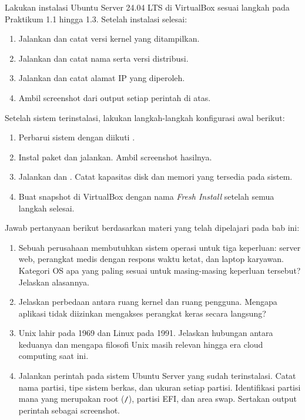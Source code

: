 \begin{exercisebox}
Lakukan instalasi Ubuntu Server 24.04 LTS di VirtualBox sesuai langkah pada
Praktikum 1.1 hingga 1.3. Setelah instalasi selesai:
\begin{enumerate}
    \item Jalankan  dan catat versi kernel yang ditampilkan.
    \item Jalankan  dan catat nama serta versi distribusi.
    \item Jalankan  dan catat alamat IP yang diperoleh.
    \item Ambil screenshot dari output setiap perintah di atas.
\end{enumerate}
\end{exercisebox}

\begin{exercisebox}
Setelah sistem terinstalasi, lakukan langkah-langkah konfigurasi awal berikut:
\begin{enumerate}
    \item Perbarui sistem dengan  diikuti .
    \item Instal paket  dan jalankan. Ambil screenshot hasilnya.
    \item Jalankan  dan . Catat kapasitas disk dan memori yang
    tersedia pada sistem.
    \item Buat snapshot di VirtualBox dengan nama \textit{Fresh Install} setelah semua
    langkah selesai.
\end{enumerate}
\end{exercisebox}

\begin{exercisebox}
Jawab pertanyaan berikut berdasarkan materi yang telah dipelajari pada bab ini:
\begin{enumerate}
    \item Sebuah perusahaan membutuhkan sistem operasi untuk tiga keperluan: server web,
    perangkat medis dengan respons waktu ketat, dan laptop karyawan. Kategori OS apa
    yang paling sesuai untuk masing-masing keperluan tersebut? Jelaskan alasannya.
    \item Jelaskan perbedaan antara ruang kernel dan ruang pengguna. Mengapa aplikasi
    tidak diizinkan mengakses perangkat keras secara langsung?
    \item Unix lahir pada 1969 dan Linux pada 1991. Jelaskan hubungan antara keduanya
    dan mengapa filosofi Unix masih relevan hingga era cloud computing saat ini.
    \item Jalankan perintah  pada sistem Ubuntu Server yang sudah
    terinstalasi. Catat nama partisi, tipe sistem berkas, dan ukuran setiap partisi.
    Identifikasi partisi mana yang merupakan root (\texttt{/}), partisi EFI, dan area
    swap. Sertakan output perintah sebagai screenshot.
\end{enumerate}
\end{exercisebox}

